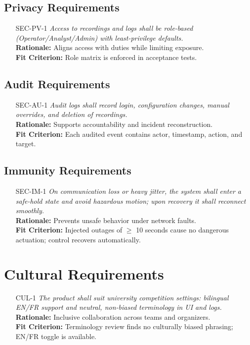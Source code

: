 \documentclass[12pt]{article}
\begin{document}
\subsection{Privacy Requirements}
\begin{itemize}[leftmargin=*]
  \item[SEC-PV-1] \emph{Access to recordings and logs shall be role-based
          (Operator/Analyst/Admin) with least-privilege defaults.}\\ \textbf{Rationale:}
        Aligns access with duties while limiting exposure.\\ \textbf{Fit Criterion:}
        Role matrix is enforced in acceptance tests.
\end{itemize}

\subsection{Audit Requirements}
\begin{itemize}[leftmargin=*]
  \item[SEC-AU-1] \emph{Audit logs shall record login, configuration changes, manual
          overrides, and deletion of recordings.}\\ \textbf{Rationale:} Supports
        accountability and incident reconstruction.\\ \textbf{Fit Criterion:} Each
        audited event contains actor, timestamp, action, and target.
\end{itemize}

\subsection{Immunity Requirements}
\begin{itemize}[leftmargin=*]
  \item[SEC-IM-1] \emph{On communication loss or heavy jitter, the system shall enter a
          safe-hold state and avoid hazardous motion; upon recovery it shall reconnect
          smoothly.}\\ \textbf{Rationale:} Prevents unsafe behavior under network
        faults.\\ \textbf{Fit Criterion:} Injected outages of $\geq$ 10 seconds cause
        no dangerous actuation; control recovers automatically.
\end{itemize}

\section{Cultural Requirements}
\begin{itemize}[leftmargin=*]
  \item[CUL-1] \emph{The product shall suit university competition settings: bilingual
          EN/FR support and neutral, non-biased terminology in UI and logs.}\\
        \textbf{Rationale:} Inclusive collaboration across teams and organizers.\\
        \textbf{Fit Criterion:} Terminology review finds no culturally biased phrasing;
        EN/FR toggle is available.
\end{itemize}
\end{document}
